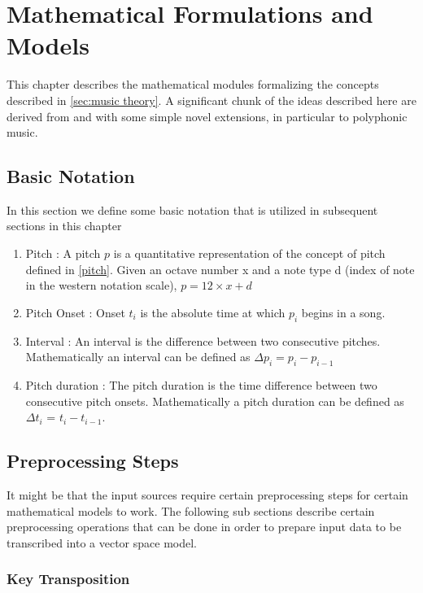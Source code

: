 \chapter{Mathematical Formulations and Models}
\label{sec:mir math}

\noindent This chapter describes the mathematical modules formalizing the  concepts described in \ref{sec:music theory}. A significant chunk of the ideas described here are derived from \cite{similie} and \cite{similietechnicalmanual} with some simple novel extensions, in particular to polyphonic music. 

\section{Basic Notation} \label{basicnotation}

\noindent In this section we define some basic notation that is utilized in subsequent sections in this chapter

\begin{enumerate}
\item Pitch : A pitch $p$ is a quantitative representation of the concept of pitch defined in \ref{pitch}. Given an octave number x and a note type d (index of note in the western notation scale), $p = 12 \times x + d$  
\item Pitch Onset : Onset $t_i$ is the absolute time at which $p_i$ begins in a song. 
\item Interval : An interval is the difference between two consecutive pitches. Mathematically an interval can be defined as $\Delta p_i = p_i - p_{i-1}$
\item Pitch duration : The pitch duration is the time difference between two consecutive pitch onsets. Mathematically a pitch duration can be defined as $\Delta t_i$ = $t_i - t_{i-1}$. 
\end{enumerate}

\section{Preprocessing Steps} \label{sim:preprocess}

\noindent It might be that the input sources require certain preprocessing steps for certain mathematical models to work. The following sub sections describe certain preprocessing operations that can be done in order to prepare input data to be transcribed into a vector space model. 

\subsection{Key Transposition} \label{tonalityalignment}

